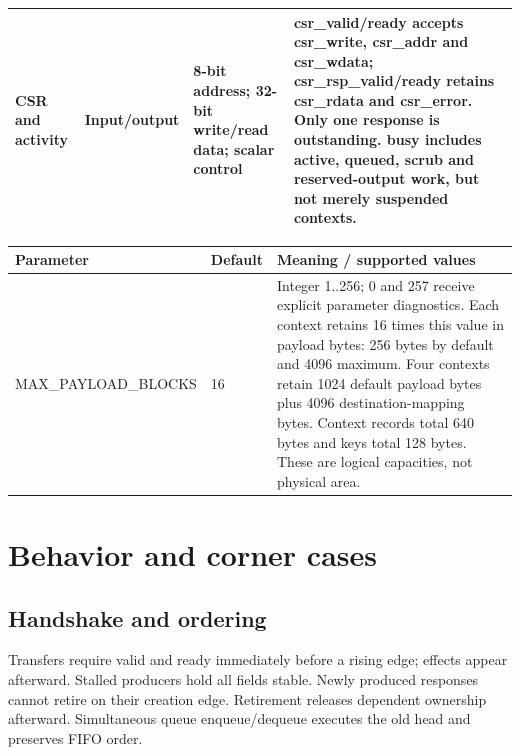 \documentclass[11pt,a4paper]{article}
\begin{document}
{\begin{longtable}{@{}L{0.21\textwidth}|L{0.12\textwidth}|L{0.12\textwidth}|L{0.45\textwidth}@{}}
CSR and activity & Input/\allowbreak{}output & 8-bit address; 32-bit write/\allowbreak{}read data; scalar control & csr\_\allowbreak{}valid/\allowbreak{}ready accepts csr\_\allowbreak{}write,\allowbreak{} csr\_\allowbreak{}addr and csr\_\allowbreak{}wdata; csr\_\allowbreak{}rsp\_\allowbreak{}valid/\allowbreak{}ready retains csr\_\allowbreak{}rdata and csr\_\allowbreak{}error. Only one response is outstanding. busy includes active,\allowbreak{} queued,\allowbreak{} scrub and reserved-output work,\allowbreak{} but not merely suspended contexts.\\[2pt]\hline

\bottomrule\end{longtable}}

{\small\renewcommand{\arraystretch}{1.18}\begin{longtable}{@{}L{0.22\textwidth}|L{0.21\textwidth}|L{0.49\textwidth}@{}}\toprule

\textbf{Parameter} & \textbf{Default} & \textbf{Meaning /\allowbreak{} supported values}\\\midrule\endhead

MAX\_\allowbreak{}PAYLOAD\_\allowbreak{}BLOCKS & 16 & Integer 1..256; 0 and 257 receive explicit parameter diagnostics. Each context retains 16 times this value in payload bytes: 256 bytes by default and 4096 maximum. Four contexts retain 1024 default payload bytes plus 4096 destination-mapping bytes. Context records total 640 bytes and keys total 128 bytes. These are logical capacities,\allowbreak{} not physical area.\\[2pt]\hline

\bottomrule\end{longtable}}

\section{Behavior and corner cases}

\subsection{Handshake and ordering}

Transfers require valid and ready immediately before a rising edge; effects appear afterward. Stalled producers hold all fields stable. Newly produced responses cannot retire on their creation edge. Retirement releases dependent ownership afterward. Simultaneous queue enqueue/\allowbreak{}dequeue executes the old head and preserves FIFO order.
\end{document}

